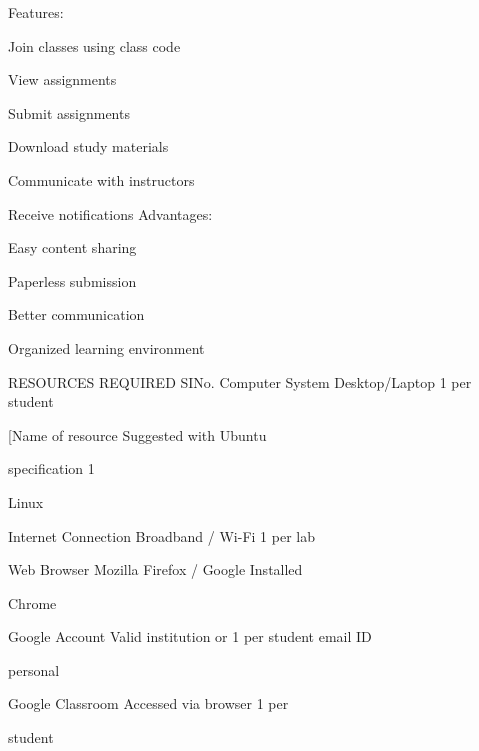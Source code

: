 \documentclass[10pt,a4paper]{article}
\begin{document}
\noindent Features:\par
\noindent\textbullet\; Join classes using class code\par
\noindent\textbullet\; View assignments\par
\noindent\textbullet\; Submit assignments\par
\noindent\textbullet\; Download study materials\par
\noindent\textbullet\; Communicate with instructors\par
\noindent\textbullet\; Receive notifications Advantages:\par
\noindent\textbullet\; Easy content sharing\par
\noindent\textbullet\; Paperless submission\par
\noindent\textbullet\; Better communication\par
\noindent\textbullet\; Organized learning environment\par

\noindent RESOURCES REQUIRED SINo.               Computer System Desktop/Laptop    1 per student\par
\noindent [Name of resource Suggested            with Ubuntu\par
\noindent specification 1\par

\noindent Linux\par

                                                      Internet Connection Broadband / Wi-Fi 1 per lab\par

                                                      Web Browser Mozilla Firefox / Google Installed\par
\clearpage
\noindent Chrome\par

                                      Google Account Valid institution or   1 per student email ID\par
\noindent personal\par

                                                        Google Classroom Accessed via browser 1 per\par
\noindent student\par
\end{document}
